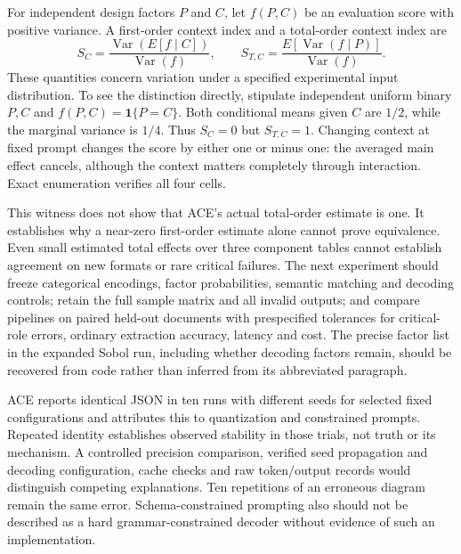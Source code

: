 For independent design factors $P$ and $C$, let $f(P,C)$ be an evaluation score with positive variance. A first-order context index and a total-order context index are
\begin{equation}
 S_C=\frac{\operatorname{Var}(E[f\mid C])}{\operatorname{Var}(f)},
 \qquad
 S_{T,C}=\frac{E[\operatorname{Var}(f\mid P)]}{\operatorname{Var}(f)}.
 \label{exec21:ace-indices}
\end{equation}
These quantities concern variation under a specified experimental input distribution. To see the distinction directly, stipulate independent uniform binary $P,C$ and $f(P,C)=\mathbf 1\{P=C\}$. Both conditional means given $C$ are $1/2$, while the marginal variance is $1/4$. Thus $S_C=0$ but $S_{T,C}=1$. Changing context at fixed prompt changes the score by either one or minus one: the averaged main effect cancels, although the context matters completely through interaction. Exact enumeration verifies all four cells.\citep{exec21_ace_reference}

This witness does not show that ACE's actual total-order estimate is one. It establishes why a near-zero first-order estimate alone cannot prove equivalence. Even small estimated total effects over three component tables cannot establish agreement on new formats or rare critical failures. The next experiment should freeze categorical encodings, factor probabilities, semantic matching and decoding controls; retain the full sample matrix and all invalid outputs; and compare pipelines on paired held-out documents with prespecified tolerances for critical-role errors, ordinary extraction accuracy, latency and cost. The precise factor list in the expanded Sobol run, including whether decoding factors remain, should be recovered from code rather than inferred from its abbreviated paragraph.

ACE reports identical JSON in ten runs with different seeds for selected fixed configurations and attributes this to quantization and constrained prompts. Repeated identity establishes observed stability in those trials, not truth or its mechanism. A controlled precision comparison, verified seed propagation and decoding configuration, cache checks and raw token/output records would distinguish competing explanations. Ten repetitions of an erroneous diagram remain the same error. Schema-constrained prompting also should not be described as a hard grammar-constrained decoder without evidence of such an implementation.\citep{exec21_ace}

